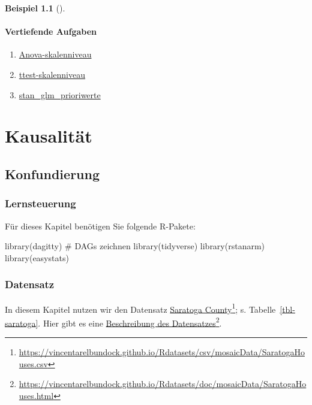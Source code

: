 \documentclass[
  ngerman,
  letterpaper,
  twoside,
  open=any]{scrbook}
\newenvironment{Shaded}{\begin{snugshade}}{\end{snugshade}}
\newcommand{\CommentTok}[1]{\textcolor[rgb]{0.37,0.37,0.37}{#1}}
\newcommand{\FunctionTok}[1]{\textcolor[rgb]{0.28,0.35,0.67}{#1}}
\newcommand{\NormalTok}[1]{\textcolor[rgb]{0.00,0.23,0.31}{#1}}
\providecommand{\tightlist}{%
  \setlength{\itemsep}{0pt}\setlength{\parskip}{0pt}}\usepackage{longtable,booktabs,array}
\theoremstyle{definition}
\newtheorem{example}{Beispiel}[chapter]
\theoremstyle{plain}
\theoremstyle{definition}
\theoremstyle{definition}
\theoremstyle{remark}
\begin{document}
\begin{example}[]
\subsection{Vertiefende Aufgaben}\label{vertiefende-aufgaben}

\begin{enumerate}
\def\labelenumi{\arabic{enumi}.}
\tightlist
\item
  \href{https://datenwerk.netlify.app/posts/anova-skalenniveau/anova-skalenniveau.html}{Anova-skalenniveau}
\item
  \href{https://datenwerk.netlify.app/posts/ttest-skalenniveau/ttest-skalenniveau.html}{ttest-skalenniveau}
\item
  \href{https://datenwerk.netlify.app/posts/stan_glm_prioriwerte/stan_glm_prioriwerte.html}{stan\_glm\_prioriwerte}
\end{enumerate}

\part{Kausalität}

\chapter{Konfundierung}\label{sec-kausal}

\section{Lernsteuerung}\label{lernsteuerung-11}

\providecommand{\indep}{\perp \!\!\! \perp}

Für dieses Kapitel benötigen Sie folgende R-Pakete:

\begin{Shaded}
\begin{Highlighting}[]
\FunctionTok{library}\NormalTok{(dagitty)  }\CommentTok{\# DAGs zeichnen}
\FunctionTok{library}\NormalTok{(tidyverse)}
\FunctionTok{library}\NormalTok{(rstanarm)}
\FunctionTok{library}\NormalTok{(easystats)}
\end{Highlighting}
\end{Shaded}

\section{Datensatz}\label{sec-kausal-daten}

In diesem Kapitel nutzen wir den Datensatz
\href{https://vincentarelbundock.github.io/Rdatasets/csv/mosaicData/SaratogaHouses.csv}{Saratoga
County}\footnote{\url{https://vincentarelbundock.github.io/Rdatasets/csv/mosaicData/SaratogaHouses.csv}};
s. Tabelle~\ref{tbl-saratoga}. Hier gibt es eine
\href{https://vincentarelbundock.github.io/Rdatasets/doc/mosaicData/SaratogaHouses.html}{Beschreibung
des Datensatzes}\footnote{\url{https://vincentarelbundock.github.io/Rdatasets/doc/mosaicData/SaratogaHouses.html}}.


\end{example}
\end{document}

